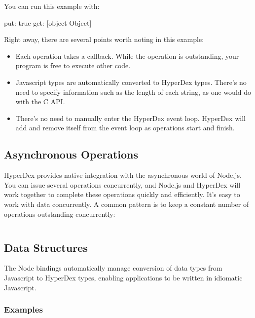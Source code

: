 You can run this example with:

\begin{consolecode}
put: true
get: [object Object]
\end{consolecode}

Right away, there are several points worth noting in this example:

\begin{itemize}
\item Each operation takes a callback.  While the operation is outstanding, your
program is free to execute other code.

\item Javascript types are automatically converted to HyperDex types.  There's
no need to specify information such as the length of each string, as one would
do with the C API.

\item There's no need to manually enter the HyperDex event loop.  HyperDex will
add and remove itself from the event loop as operations start and finish.
\end{itemize}

\subsection{Asynchronous Operations}
\label{sec:api:node:async-ops}

HyperDex provides native integration with the asynchronous world of Node.js.
You can issue several operations concurrently, and Node.js and HyperDex will
work together to complete these operations quickly and efficiently.  It's easy
to work with data concurrently.  A common pattern is to keep a constant number
of operations outstanding concurrently:

\inputminted{javascript}{\topdir/node.js/client/window-pattern.js}

\subsection{Data Structures}
\label{sec:api:node:data-structures}

The Node bindings automatically manage conversion of data types from Javascript
to HyperDex types, enabling applications to be written in idiomatic Javascript.

\subsubsection{Examples}
\label{sec:api:node:examples}

